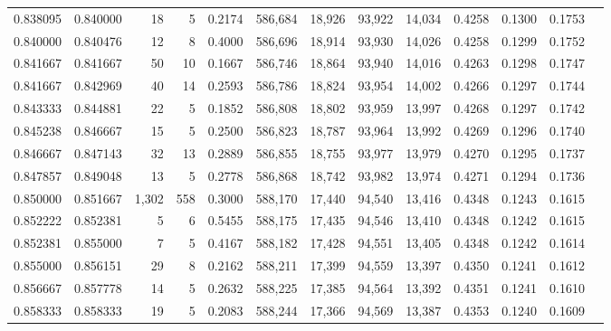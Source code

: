 \begin{tabular}{rrrrrrrrrrrrr}
0.838095 & 0.840000 &     18 &      5 &                                     0.2174 & 586,684 &  18,926 &  93,922 &  14,034 & 0.4258 & 0.1300 & 0.1753 \\
0.840000 & 0.840476 &     12 &      8 &                                     0.4000 & 586,696 &  18,914 &  93,930 &  14,026 & 0.4258 & 0.1299 & 0.1752 \\
0.841667 & 0.841667 &     50 &     10 &                                     0.1667 & 586,746 &  18,864 &  93,940 &  14,016 & 0.4263 & 0.1298 & 0.1747 \\
0.841667 & 0.842969 &     40 &     14 &                                     0.2593 & 586,786 &  18,824 &  93,954 &  14,002 & 0.4266 & 0.1297 & 0.1744 \\
0.843333 & 0.844881 &     22 &      5 &                                     0.1852 & 586,808 &  18,802 &  93,959 &  13,997 & 0.4268 & 0.1297 & 0.1742 \\
0.845238 & 0.846667 &     15 &      5 &                                     0.2500 & 586,823 &  18,787 &  93,964 &  13,992 & 0.4269 & 0.1296 & 0.1740 \\
0.846667 & 0.847143 &     32 &     13 &                                     0.2889 & 586,855 &  18,755 &  93,977 &  13,979 & 0.4270 & 0.1295 & 0.1737 \\
0.847857 & 0.849048 &     13 &      5 &                                     0.2778 & 586,868 &  18,742 &  93,982 &  13,974 & 0.4271 & 0.1294 & 0.1736 \\
0.850000 & 0.851667 &  1,302 &    558 &                                     0.3000 & 588,170 &  17,440 &  94,540 &  13,416 & 0.4348 & 0.1243 & 0.1615 \\
0.852222 & 0.852381 &      5 &      6 &                                     0.5455 & 588,175 &  17,435 &  94,546 &  13,410 & 0.4348 & 0.1242 & 0.1615 \\
0.852381 & 0.855000 &      7 &      5 &                                     0.4167 & 588,182 &  17,428 &  94,551 &  13,405 & 0.4348 & 0.1242 & 0.1614 \\
0.855000 & 0.856151 &     29 &      8 &                                     0.2162 & 588,211 &  17,399 &  94,559 &  13,397 & 0.4350 & 0.1241 & 0.1612 \\
0.856667 & 0.857778 &     14 &      5 &                                     0.2632 & 588,225 &  17,385 &  94,564 &  13,392 & 0.4351 & 0.1241 & 0.1610 \\
0.858333 & 0.858333 &     19 &      5 &                                     0.2083 & 588,244 &  17,366 &  94,569 &  13,387 & 0.4353 & 0.1240 & 0.1609 \\

\end{tabular}

